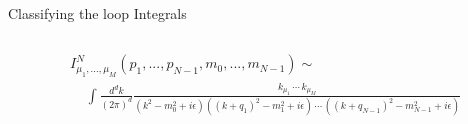 \documentclass[aspectratio=169,usenames,dvipsnames]{beamer}
\begin{document}
\begin{frame}[t]{\centering {}\\ Classifying the loop Integrals} 
\setlength{\abovedisplayskip}{0pt}
\setlength{\belowdisplayskip}{0pt}
\begin{columns}
  \begin{column}{0.75\textwidth}
\centering\scriptsize\begin{align*}
  &I^N_{\mu_1, ..., \mu_M}(p_1,...,p_{N-1},m_0,...,m_{N-1}) \sim \\
 &\;\;\;\;  \int \frac{d^d k}{(2\pi)^d} \frac{k_{\mu_1} \,\cdots\, k_{\mu_M}}{(k^2-m_0^2+i\epsilon)((k+q_1)^2-m_1^2+i\epsilon)\,\cdots\, ((k+q_{N-1})^2-m_{N-1}^2+i\epsilon)} 
\end{align*}


\end{column}
\end{columns}
\end{frame}
\end{document}
